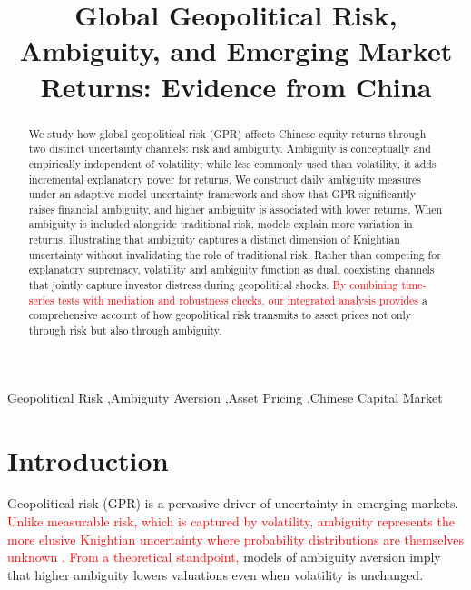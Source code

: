 \documentclass[preprint,12pt,authoryear]{elsarticle}
\begin{document}
\begin{frontmatter}

\title{Global Geopolitical Risk, Ambiguity, and Emerging Market Returns: Evidence from China}

\begin{abstract}
We study how global geopolitical risk (GPR) affects Chinese equity returns through two distinct uncertainty channels: risk and ambiguity. Ambiguity is conceptually and empirically independent of volatility; while less commonly used than volatility, it adds incremental explanatory power for returns. We construct daily ambiguity measures under an adaptive model uncertainty framework and show that GPR significantly raises financial ambiguity, and higher ambiguity is associated with lower returns. When ambiguity is included alongside traditional risk, models explain more variation in returns, illustrating that ambiguity captures a distinct dimension of Knightian uncertainty without invalidating the role of traditional risk. Rather than competing for explanatory supremacy, volatility and ambiguity function as dual, coexisting channels that jointly capture investor distress during geopolitical shocks. \textcolor{red}{By combining time-series tests with mediation and robustness checks, our integrated analysis provides} a comprehensive account of how geopolitical risk transmits to asset prices not only through risk but also through ambiguity.
\end{abstract}

\begin{keyword}
Geopolitical Risk \sep Ambiguity Aversion \sep Asset Pricing \sep Chinese Capital Market
\end{keyword}

\end{frontmatter}

\section{Introduction}

Geopolitical risk (GPR) is a pervasive driver of uncertainty in emerging markets. \textcolor{red}{Unlike measurable risk, which is captured by volatility, ambiguity represents the more elusive Knightian uncertainty where probability distributions are themselves unknown \citep{Knight1921, Ellsberg1961}. From a theoretical standpoint,} models of ambiguity aversion \citep{Gilboa1989, Klibanoff2005} imply that higher ambiguity lowers valuations even when volatility is unchanged.
\end{document}
